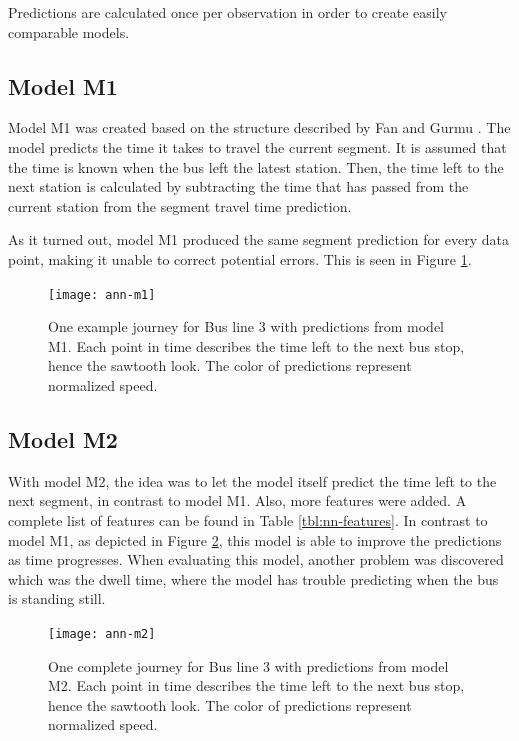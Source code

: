 Predictions are calculated once per observation in order to create easily comparable models.

\subsection{Model M1}
Model M1 was created based on the structure described by Fan and Gurmu \cite{brazilANN}. The model predicts the time it takes to travel the current segment. It is assumed that the time is known when the bus left the latest station. Then, the time left to the next station is calculated by subtracting the time that has passed from the current station from the segment travel time prediction.

As it turned out, model M1 produced the same segment prediction for every data point, making it unable to correct potential errors. This is seen in Figure \ref{fig:ann-m1}.


\begin{figure}[h]
	\begin{minipage}{\textwidth}
		\begin{adjustbox}{center}
			\texttt{[image: ann-m1]}
		\end{adjustbox}  
		\caption{One example journey for Bus line 3 with predictions from model M1. Each point in time describes the time left to the next bus stop, hence the sawtooth look. The color of predictions represent normalized speed.}
		\label{fig:ann-m1}      
	\end{minipage}
\end{figure}


\subsection{Model M2}\label{M2}
With model M2, the idea was to let the model itself predict the time left to the next segment, in contrast to model M1. Also, more features were added. A complete list of features can be found in Table \ref{tbl:nn-features}. In contrast to model M1, as depicted in Figure \ref{fig:ann-m2}, this model is able to improve the predictions as time progresses. When evaluating this model, another problem was discovered which was the dwell time, where the model has trouble predicting when the bus is standing still. 


\begin{figure}[h]
	\begin{minipage}{\textwidth}
		\begin{adjustbox}{center}
			\texttt{[image: ann-m2]}
		\end{adjustbox}  
		\caption{One complete journey for Bus line 3 with predictions from model M2. Each point in time describes the time left to the next bus stop, hence the sawtooth look. The color of predictions represent normalized speed.}
		\label{fig:ann-m2}      
	\end{minipage}
\end{figure}



